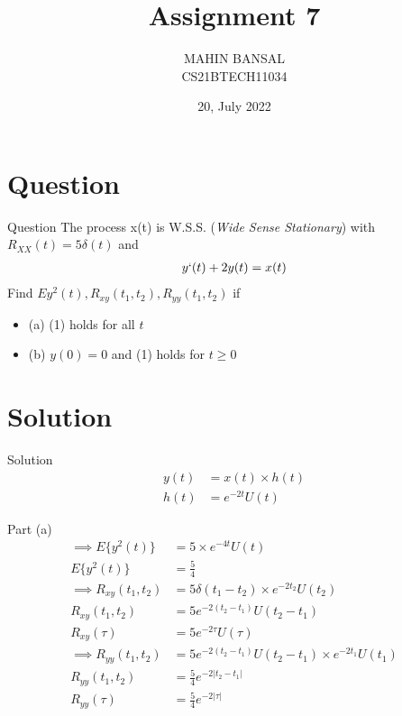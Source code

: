\documentclass{beamer}
\title{Assignment 7}
\author{MAHIN BANSAL \\CS21BTECH11034}
\date{20, July 2022}
\begin{document}
\begin{frame}
    \titlepage 
\end{frame}

\logo{}




\section{Question}
\begin{frame}{Question}
    The process x(t) is W.S.S. (\textit{Wide Sense Stationary}) with $R_{XX}(t) = 5 \delta (t)$ and 
    \begin{align}
        y`(t) + 2y(t) = x(t)
    \end{align}
    Find $E{y^2(t)}, R_{xy}(t_1,t_2), R_{yy}(t_1,t_2)$ if\\
    \begin{itemize}
        \item (a) (1) holds for all $t$
        \item (b) $y(0) = 0$ and (1) holds for $t \geq 0$
    \end{itemize}
\end{frame}

\section{Solution}
\begin{frame}{Solution}
    \begin{align}
        y(t) &= x(t) \times h(t)\\
        h(t) &= e^{-2t}U(t)
    \end{align}
\end{frame}

\begin{frame}{Part (a)}
    \begin{align}
        \implies E\{y^2(t)\} &= 5\times e^{-4t} U(t)\\
        E\{y^2(t)\} &= \frac{5}{4}\\
        \implies R_{xy}(t_1,t_2) &= 5\delta(t_1 - t_2)\times e^{-2t_2} U(t_2)\\
        R_{xy}(t_1,t_2) &= 5e^{-2(t_2 - t_1)} U(t_2 - t_1)\\
        R_{xy}(\tau) &= 5e^{-2\tau}U(\tau)\\
        \implies R_{yy}(t_1,t_2) &= 5e^{-2(t_2 - t_1)} U(t_2 - t_1) \times e^{-2t_1}U(t_1)\\
        R_{yy}(t_1,t_2) &= \frac{5}{4}e^{-2|t_2 - t_1|}\\
        R_{yy}(\tau) &= \frac{5}{4}e^{-2|\tau|}
    \end{align}
\end{frame}
\end{document}
